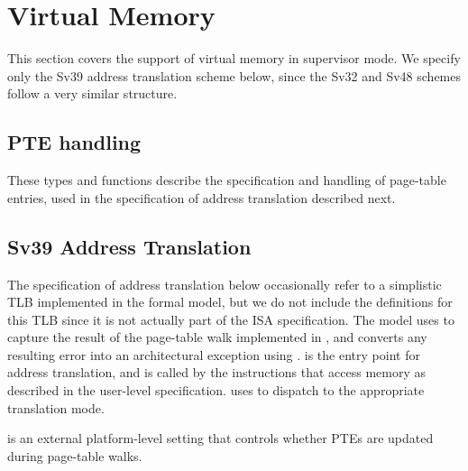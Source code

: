 \begin{formalspec}
  \sailfnexceptionDelegatee
  \sailfnhandleTrap
  \sailfnhandleException
  \sailfnhandleMemException
  \sailfnhandleInterrupt
  \sailfnhandleIllegal
\end{formalspec}

\section{Virtual Memory}
\label{s:priv-sail-vmem}

This section covers the support of virtual memory in supervisor mode.
We specify only the Sv39 address translation scheme below, since the
Sv32 and Sv48 schemes follow a very similar structure.

\subsection{PTE handling}
\label{ss:priv-sail-ptes}

These types and functions describe the specification and handling of
page-table entries, used in the specification of address translation
described next.

\begin{formalspec}
  \sailtypepteAttribs
  \sailtypePTEBits
  \sailfnisPTEPtr
  \sailfnisInvalidPTE
  \sailfncheckPTEPermission
  \sailfnupdatePTEBits
\end{formalspec}

\subsection{Sv39 Address Translation}
\label{ss:priv-sail-addr-trans}

The specification of address translation below occasionally refer to a
simplistic TLB implemented in the formal model, but we do not include
the definitions for this TLB since it is not actually part of the ISA
specification.  The model uses  to capture the
result of the page-table walk implemented in , and
converts any resulting error into an architectural exception using
.  is the
entry point for address translation, and is called by the instructions
that access memory as described in the user-level specification.
 uses  to dispatch
to the appropriate translation mode.

 is an external platform-level
setting that controls whether PTEs are updated during page-table
walks.

\begin{formalspec}
  \sailtypePTWError
  \sailtypePTWResult
  \sailfntranslationException
  \sailfnwalkThreeNine
  \sailfntranslateThreeNine
  \sailfntranslationMode
  \sailtypeTRResult
  \sailfntranslateAddr
\end{formalspec}

